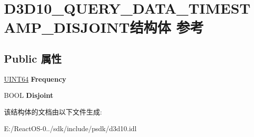 \hypertarget{struct_d3_d10___q_u_e_r_y___d_a_t_a___t_i_m_e_s_t_a_m_p___d_i_s_j_o_i_n_t}{}\section{D3\+D10\+\_\+\+Q\+U\+E\+R\+Y\+\_\+\+D\+A\+T\+A\+\_\+\+T\+I\+M\+E\+S\+T\+A\+M\+P\+\_\+\+D\+I\+S\+J\+O\+I\+N\+T结构体 参考}
\label{struct_d3_d10___q_u_e_r_y___d_a_t_a___t_i_m_e_s_t_a_m_p___d_i_s_j_o_i_n_t}
\subsection*{Public 属性}
\begin{DoxyCompactItemize}
\item 
\mbox{\label{struct_d3_d10___q_u_e_r_y___d_a_t_a___t_i_m_e_s_t_a_m_p___d_i_s_j_o_i_n_t_ab3754bed0410609af61a6540ca241b52}} 
\hyperlink{_processor_bind_8h_a57be03562867144161c1bfee95ca8f7c}{U\+I\+N\+T64} {\bfseries Frequency}
\item 
\mbox{\label{struct_d3_d10___q_u_e_r_y___d_a_t_a___t_i_m_e_s_t_a_m_p___d_i_s_j_o_i_n_t_ad7f860191b6925fadcb2e1ee376e5d19}} 
B\+O\+OL {\bfseries Disjoint}
\end{DoxyCompactItemize}


该结构体的文档由以下文件生成\+:\begin{DoxyCompactItemize}
\item 
E\+:/\+React\+O\+S-\/0../sdk/include/psdk/d3d10.\+idl\end{DoxyCompactItemize}
